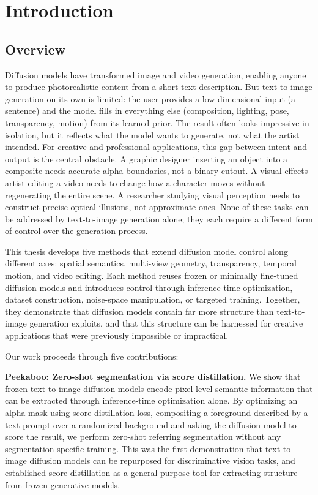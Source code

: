 \chapter{Introduction}
\label{chapter:introduction}

\section{Overview}

Diffusion models have transformed image and video generation, enabling anyone to produce photorealistic content from a short text description. But text-to-image generation on its own is limited: the user provides a low-dimensional input (a sentence) and the model fills in everything else (composition, lighting, pose, transparency, motion) from its learned prior. The result often looks impressive in isolation, but it reflects what the model wants to generate, not what the artist intended. For creative and professional applications, this gap between intent and output is the central obstacle. A graphic designer inserting an object into a composite needs accurate alpha boundaries, not a binary cutout. A visual effects artist editing a video needs to change how a character moves without regenerating the entire scene. A researcher studying visual perception needs to construct precise optical illusions, not approximate ones. None of these tasks can be addressed by text-to-image generation alone; they each require a different form of control over the generation process.

This thesis develops five methods that extend diffusion model control along different axes: spatial semantics, multi-view geometry, transparency, temporal motion, and video editing. Each method reuses frozen or minimally fine-tuned diffusion models and introduces control through inference-time optimization, dataset construction, noise-space manipulation, or targeted training. Together, they demonstrate that diffusion models contain far more structure than text-to-image generation exploits, and that this structure can be harnessed for creative applications that were previously impossible or impractical.

Our work proceeds through five contributions:

\textbf{Peekaboo: Zero-shot segmentation via score distillation.}
We show that frozen text-to-image diffusion models encode pixel-level semantic information that can be extracted through inference-time optimization alone. By optimizing an alpha mask using score distillation loss, compositing a foreground described by a text prompt over a randomized background and asking the diffusion model to score the result, we perform zero-shot referring segmentation without any segmentation-specific training. This was the first demonstration that text-to-image diffusion models can be repurposed for discriminative vision tasks, and established score distillation as a general-purpose tool for extracting structure from frozen generative models.

